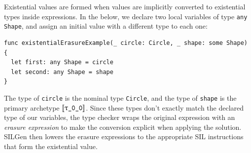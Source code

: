 \documentclass[../generics]{subfiles}
\begin{document}
Existential values are formed when values are implicitly converted to existential types inside expressions. In the below, we declare two local variables of type \texttt{any Shape}, and assign an initial value with a different type to each one:
\begin{Verbatim}
func existentialErasureExample(_ circle: Circle, _ shape: some Shape) {
  let first: any Shape = circle
  let second: any Shape = shape
}
\end{Verbatim}
The type of \texttt{circle} is the nominal type \texttt{Circle}, and the type of \texttt{shape} is the primary archetype $\archetype{\rT}$. Since these types don't exactly match the declared type of our variables, the type checker wraps the original expression with an \emph{erasure expression} to make the conversion explicit when applying the solution. SILGen then lowers the erasure expressions to the appropriate SIL instructions that form the existential value.
\end{document}
